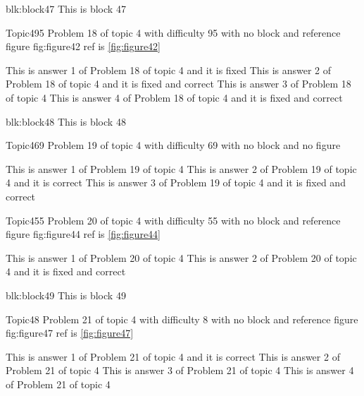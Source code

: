 \documentclass[master]{exam}
\begin{document}
\begin{block}{blk:block47}
This is block 47
\end{block}


\begin{problem}{Topic4}{95}
	Problem 18 of topic 4 with difficulty 95 with no block and reference figure fig:figure42 ref is \ref{fig:figure42}
	\begin{answers}
		\answer[fixed] This is answer 1 of Problem 18 of topic 4 and it is fixed
		 This is answer 2 of Problem 18 of topic 4 and it is fixed and correct
		\answer This is answer 3 of Problem 18 of topic 4 
		 This is answer 4 of Problem 18 of topic 4 and it is fixed and correct
	\end{answers}
\end{problem}



\begin{block}{blk:block48}
This is block 48
\end{block}


\begin{problem}{Topic4}{69}
	Problem 19 of topic 4 with difficulty 69 with no block and no figure
	\begin{answers}
		\answer This is answer 1 of Problem 19 of topic 4 
		\answer[correct] This is answer 2 of Problem 19 of topic 4 and it is correct
		 This is answer 3 of Problem 19 of topic 4 and it is fixed and correct
	\end{answers}
\end{problem}

\begin{problem}{Topic4}{55}
	Problem 20 of topic 4 with difficulty 55 with no block and reference figure fig:figure44 ref is \ref{fig:figure44}
	\begin{answers}
		\answer This is answer 1 of Problem 20 of topic 4 
		 This is answer 2 of Problem 20 of topic 4 and it is fixed and correct
	\end{answers}
\end{problem}



\begin{block}{blk:block49}
This is block 49
\end{block}


\begin{problem}{Topic4}{8}
	Problem 21 of topic 4 with difficulty 8 with no block and reference figure fig:figure47 ref is \ref{fig:figure47}
	\begin{answers}
		\answer[correct] This is answer 1 of Problem 21 of topic 4 and it is correct
		\answer This is answer 2 of Problem 21 of topic 4 
		\answer This is answer 3 of Problem 21 of topic 4 
		\answer This is answer 4 of Problem 21 of topic 4 
	\end{answers}
\end{problem}
\end{document}

